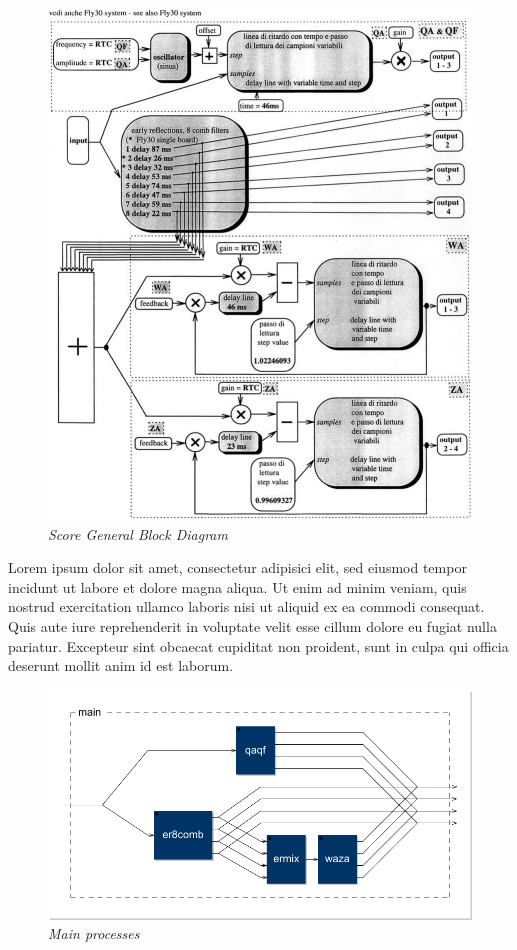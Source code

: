 \documentclass[twoside,a4paper]{article}
\begin{document}
\begin{figure}[ht]
\centerline{\includegraphics[scale=0.5]{img/1-comp}}
\caption{\label{fft_plot}{\it Score General Block Diagram}}
\end{figure}

Lorem ipsum dolor sit amet, consectetur adipisici elit, sed eiusmod tempor
incidunt ut labore et dolore magna aliqua. Ut enim ad minim veniam, quis
nostrud exercitation ullamco laboris nisi ut aliquid ex ea commodi consequat.
Quis aute iure reprehenderit in voluptate velit esse cillum dolore eu fugiat
nulla pariatur. Excepteur sint obcaecat cupiditat non proident, sunt in culpa
qui officia deserunt mollit anim id est laborum.

\begin{figure}[ht]
\centerline{\includegraphics[scale=0.5]{img/main}}
\caption{\label{fft_plot}{\it Main processes}}
\end{figure}
\end{document}
